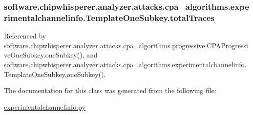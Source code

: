 \subsubsection[{total\+Traces}]{\setlength{\rightskip}{0pt plus 5cm}software.\+chipwhisperer.\+analyzer.\+attacks.\+cpa\+\_\+algorithms.\+experimentalchannelinfo.\+Template\+One\+Subkey.\+total\+Traces}\label{classsoftware_1_1chipwhisperer_1_1analyzer_1_1attacks_1_1cpa__algorithms_1_1experimentalchannelinfo_1_1TemplateOneSubkey_a761436db7796a3c2118b452fcd74f2fb}


Referenced by software.\+chipwhisperer.\+analyzer.\+attacks.\+cpa\+\_\+algorithms.\+progressive.\+C\+P\+A\+Progressive\+One\+Subkey.\+one\+Subkey(), and software.\+chipwhisperer.\+analyzer.\+attacks.\+cpa\+\_\+algorithms.\+experimentalchannelinfo.\+Template\+One\+Subkey.\+one\+Subkey().



The documentation for this class was generated from the following file\+:\begin{DoxyCompactItemize}
\item 
\hyperlink{experimentalchannelinfo_8py}{experimentalchannelinfo.\+py}\end{DoxyCompactItemize}
